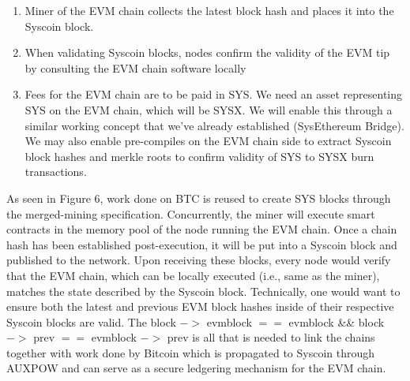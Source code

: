 \documentclass[peerreview]{ieeesyscoin}
\begin{document}
\begin{enumerate}
\item Miner of the EVM chain collects the latest block hash and places it into the Syscoin block.
\item When validating Syscoin blocks, nodes confirm the validity of the EVM tip by consulting the EVM chain software locally
\item Fees for the EVM chain are to be paid in SYS. We need an asset representing SYS on the EVM chain, which will be SYSX. We will enable this through a similar working concept that we’ve already established (SysEthereum Bridge). We may also enable pre-compiles on the EVM chain side to extract Syscoin block hashes and merkle roots to confirm validity of SYS to SYSX burn transactions.
\end{enumerate}

As seen in Figure 6, work done on BTC is reused to create SYS blocks through the merged-mining specification. Concurrently, the miner will execute smart contracts in the memory pool of the node running the EVM chain. Once a chain hash has been established post-execution, it will be put into a Syscoin block and published to the network. Upon receiving these blocks, every node would verify that the EVM chain, which can be locally executed (i.e., same as the miner), matches the state described by the Syscoin block. Technically, one would want to ensure both the latest and previous EVM block hashes inside of their respective Syscoin blocks are valid. The block $->$ evmblock $==$ evmblock \&\& block $->$ prev $==$ evmblock $->$ prev is all that is needed to link the chains together with work done by Bitcoin which is propagated to Syscoin through AUXPOW and can serve as a secure ledgering mechanism for the EVM chain.
\end{document}
